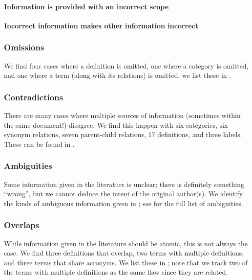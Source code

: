 \paragraph{Information is provided with an incorrect scope}
\parSheetTestFlaw{}

\paragraph{Incorrect information makes other information incorrect}
\redBoxFlaw{}

\subsubsection{Omissions}\label{miss}
We find four cases where a definition is omitted, one where a category is
omitted, and one where a term (along with its relations) is omitted\ifnotpaper;
we list these in \fi.

\subsubsection{Contradictions}\label{contra}
There are many cases where multiple sources of information (sometimes within
the same document!) disagree. We find this happen with six categories, six
synonym relations, seven parent-child relations, 17 definitions, and three
labels. \ifnotpaper These can be found in .\fi

\subsubsection{Ambiguities}\label{ambi}
Some information given in the literature is unclear; there is definitely
something ``wrong'', but we cannot deduce the intent of the original author(s).
We identify the kinds of ambiguous information given in %
\ifnotpaper; see  for the full list of ambiguities\fi.



\subsubsection{Overlaps}\label{over}
While information given in the literature should be atomic, this is not
always the case. We find three definitions that overlap, two terms with
multiple definitions, and three terms that share acronyms. \ifnotpaper We list
    these in ; note that we track two of the terms with
    multiple definitions as the same flaw since they are related. \fi


